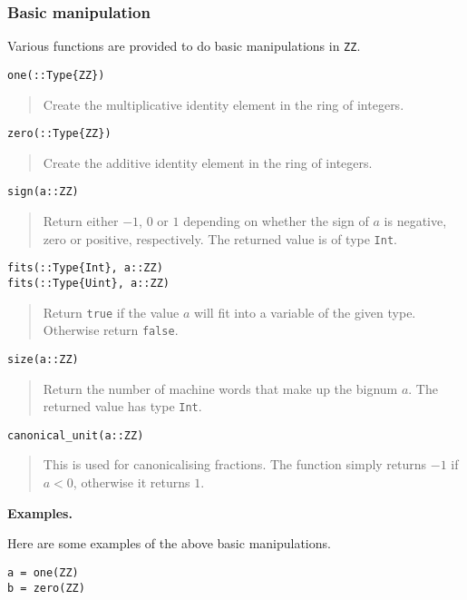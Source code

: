\documentclass[a4paper,10pt]{article}
\newcommand{\code}{\lstinline}
\newcommand{\desc}[1]{\vspace{-3mm}\begin{quote}#1\end{quote}}
\begin{document}
{\subsubsection{Basic manipulation}

Various functions are provided to do basic manipulations in \code{ZZ}.

\begin{lstlisting}
one(::Type{ZZ})
\end{lstlisting}

\desc{Create the multiplicative identity element in the ring of integers.}

\begin{lstlisting}
zero(::Type{ZZ})
\end{lstlisting}

\desc{Create the additive identity element in the ring of integers.}

\begin{lstlisting}
sign(a::ZZ)
\end{lstlisting}

\desc{Return either $-1$, $0$ or $1$ depending on whether the sign of $a$ is negative,
zero or positive, respectively. The returned value is of type \code{Int}.}

\begin{lstlisting}
fits(::Type{Int}, a::ZZ)
fits(::Type{Uint}, a::ZZ)
\end{lstlisting}

\desc{Return \code{true} if the value $a$ will fit into a variable of the given
type. Otherwise return \code{false}.}

\begin{lstlisting}
size(a::ZZ)
\end{lstlisting}

\desc{Return the number of machine words that make up the bignum $a$. The
returned value has type \code{Int}.}

\begin{lstlisting}
canonical_unit(a::ZZ)
\end{lstlisting}

\desc{This is used for canonicalising fractions. The function simply returns $-1$
if $a < 0$, otherwise it returns $1$.}

\textbf{Examples.}

Here are some examples of the above basic manipulations.

\begin{lstlisting}
a = one(ZZ)
b = zero(ZZ)


\end{lstlisting}}
\end{document}
